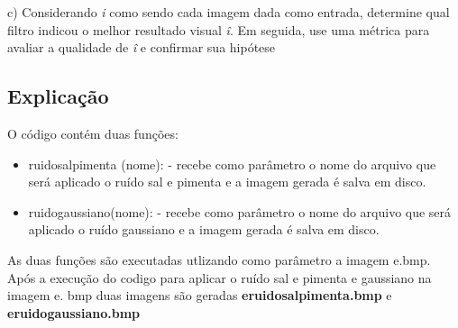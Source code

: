 \documentclass[10pt,a4paper]{article}
\begin{document}


\begin{flushleft}
c) Considerando \textit{i} como sendo cada imagem dada como entrada, determine qual filtro indicou o melhor resultado visual \textit{î}. Em seguida, use uma métrica para avaliar a qualidade de \textit{î} e confirmar sua hipótese
\end{flushleft}



\subsection{Explicação}

\begin{flushleft}
O código contém duas funções:
\end{flushleft}

\begin{itemize}
    \item {\ttfamily ruido\textunderscore sal\textunderscore pimenta (nome):} - recebe como parâmetro o nome do arquivo que será aplicado o ruído sal e pimenta e a imagem gerada é salva em disco.
    \item {\ttfamily ruido\textunderscore gaussiano(nome):}  - recebe como parâmetro o nome do arquivo que será aplicado o ruído gaussiano e a imagem gerada é salva em disco.
\end{itemize}

\begin{flushleft}
As duas funções são executadas utlizando como parâmetro a imagem e.bmp. Após a execução do codigo para aplicar o ruído sal e pimenta e gaussiano na imagem e. bmp duas imagens são geradas \textbf{e\textunderscore ruido\textunderscore salpimenta.bmp} e  \textbf{e\textunderscore ruido\textunderscore gaussiano.bmp} 
\end{flushleft}

\begin{figure}[H]
    \centering
    \qquad
\end{figure}
\end{document}
